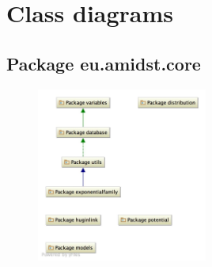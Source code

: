 \newpage
\section*{Class diagrams}
\label{sec:classDiagrams}

\subsection{Package eu.amidst.core}

\begin{figure}[H]
  \centering
    \includegraphics[width=0.5\textwidth]{ClassDiagrams/core.jpg}
\end{figure}

